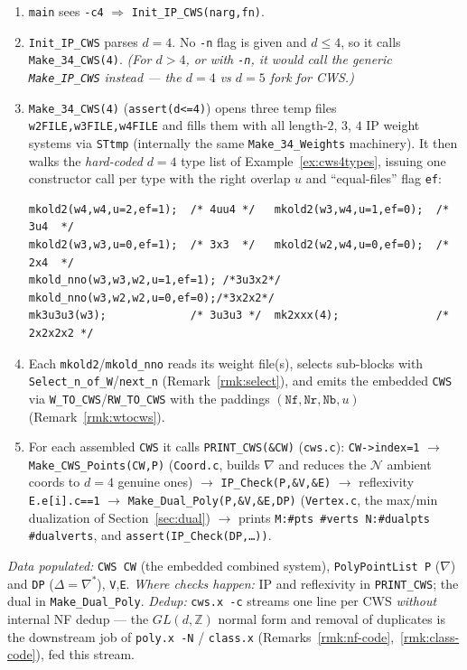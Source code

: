 \documentclass{amsart}
\begin{document}
\begin{enumerate}
  \item \texttt{main} sees \texttt{-c4} $\Rightarrow$
        \texttt{Init\_IP\_CWS(narg,fn)}.
  \item \texttt{Init\_IP\_CWS} parses $d=4$. No \texttt{-n} flag is given and
        $d\le 4$, so it calls \texttt{Make\_34\_CWS(4)}. \emph{(For $d>4$, or
        with \texttt{-n}, it would call the generic
        \texttt{Make\_IP\_CWS} instead --- the $d=4$ vs $d=5$ fork for CWS.)}
  \item \texttt{Make\_34\_CWS(4)} (\texttt{assert(d<=4)}) opens three temp
        files \texttt{w2FILE,w3FILE,w4FILE} and fills them with all length-$2$,
        $3$, $4$ IP weight systems via \texttt{STtmp} (internally the same
        \texttt{Make\_34\_Weights} machinery). It then walks the
        \emph{hard-coded} $d=4$ type list of Example~\ref{ex:cws4types},
        issuing one constructor call per type with the right overlap $u$ and
        ``equal-files'' flag \texttt{ef}:
        \begin{verbatim}
mkold2(w4,w4,u=2,ef=1);  /* 4uu4 */   mkold2(w3,w4,u=1,ef=0);  /* 3u4  */
mkold2(w3,w3,u=0,ef=1);  /* 3x3  */   mkold2(w2,w4,u=0,ef=0);  /* 2x4  */
mkold_nno(w3,w3,w2,u=1,ef=1); /*3u3x2*/ mkold_nno(w3,w2,w2,u=0,ef=0);/*3x2x2*/
mk3u3u3(w3);             /* 3u3u3 */  mk2xxx(4);               /* 2x2x2x2 */
        \end{verbatim}
  \item Each \texttt{mkold2}/\texttt{mkold\_nno} reads its weight file(s),
        selects sub-blocks with \texttt{Select\_n\_of\_W}/\texttt{next\_n}
        (Remark~\ref{rmk:select}), and emits the embedded \texttt{CWS} via
        \texttt{W\_TO\_CWS}/\texttt{RW\_TO\_CWS} with the paddings
        $(\texttt{Nf},\texttt{Nr},\texttt{Nb},u)$ (Remark~\ref{rmk:wtocws}).
  \item For each assembled \texttt{CWS} it calls \texttt{PRINT\_CWS(\&CW)}
        (\texttt{cws.c}): \texttt{CW->index=1} $\to$
        \texttt{Make\_CWS\_Points(CW,P)} (\texttt{Coord.c}, builds $\nabla$ and
        reduces the $\mathcal N$ ambient coords to $d=4$ genuine ones) $\to$
        \texttt{IP\_Check(P,\&V,\&E)} $\to$ reflexivity \texttt{E.e[i].c==1}
        $\to$ \texttt{Make\_Dual\_Poly(P,\&V,\&E,DP)} (\texttt{Vertex.c}, the
        max/min dualization of Section~\ref{sec:dual}) $\to$ prints
        \texttt{M:\#pts \#verts N:\#dualpts \#dualverts}, and
        \texttt{assert(IP\_Check(DP,\dots))}.
\end{enumerate}
\emph{Data populated:} \texttt{CWS CW} (the embedded combined system),
\texttt{PolyPointList P} ($\nabla$) and \texttt{DP} ($\Delta=\nabla^*$),
\texttt{V},\texttt{E}. \emph{Where checks happen:} IP and reflexivity in
\texttt{PRINT\_CWS}; the dual in \texttt{Make\_Dual\_Poly}.
\emph{Dedup:} \texttt{cws.x -c} streams one line per CWS \emph{without}
internal NF dedup --- the $GL(d,\mathbb{Z})$ normal form and removal of
duplicates is the downstream job of \texttt{poly.x -N} /
\texttt{class.x} (Remarks~\ref{rmk:nf-code},~\ref{rmk:class-code}), fed this
stream.
\end{document}
